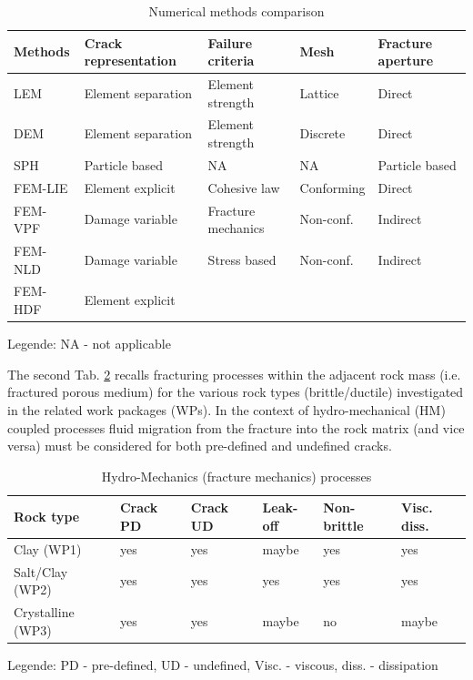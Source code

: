 \begin{table}[h!]
\centering
\caption{Numerical methods comparison}
\label{tab:num-comp}
\footnotesize
\begin{tabular}{lllll}
\hline
Methods & Crack representation & Failure criteria   & Mesh & Fracture aperture \\
\hline
LEM     & Element separation   & Element strength   & Lattice        & Direct \\
DEM     & Element separation   & Element strength   & Discrete       & Direct \\
SPH     & Particle based       & NA                 & NA             & Particle based \\
FEM-LIE & Element explicit     & Cohesive law       & Conforming     & Direct \\
FEM-VPF & Damage variable      & Fracture mechanics & Non-conf.      & Indirect \\
FEM-NLD & Damage variable      & Stress based       & Non-conf.      & Indirect \\
FEM-HDF & Element explicit     &  &  &  \\
\hline
\end{tabular}
\end{table}
\vspace{-5mm}
\tiny Legende: NA - not applicable
\normalsize

The second Tab. \ref{tab:hm-processes} recalls fracturing processes within the adjacent rock mass (i.e. fractured porous medium) for the various rock types (brittle/ductile) investigated in the related work packages (WPs). In the context of hydro-mechanical (HM) coupled processes fluid migration from the fracture into the rock matrix (and vice versa) must be considered for both pre-defined and undefined cracks.

\clearpage

\begin{table}[h!]
\centering
\caption{Hydro-Mechanics (fracture mechanics) processes}
\label{tab:hm-processes}
\footnotesize
\begin{tabular}{llllll}
\hline
Rock type         & Crack PD & Crack UD & Leak-off & Non-brittle & Visc. diss.\\
\hline
Clay (WP1)        & yes & yes & maybe & yes & yes \\
Salt/Clay (WP2)   & yes & yes & yes   & yes & yes \\
Crystalline (WP3) & yes & yes & maybe & no  & maybe \\
\hline
\end{tabular}
\end{table}
\vspace{-5mm}
\tiny Legende: PD - pre-defined, UD - undefined, Visc. - viscous, diss. - dissipation
\normalsize

